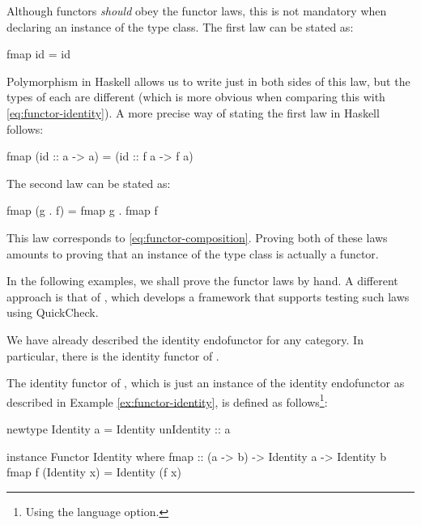 Although functors \emph{should} obey the functor laws, this is not
mandatory when declaring an instance of the  type
class. The first law can be stated as:
\begin{codehaskell}
fmap id = id
\end{codehaskell}
Polymorphism in Haskell allows us to write just  in
both sides of this law, but the types of each  are
different (which is more obvious when comparing this with
\eqref{eq:functor-identity}). A more precise way of stating the first
law in Haskell follows:
\begin{codehaskell}
fmap (id :: a -> a) = (id :: f a -> f a)
\end{codehaskell}
The second law can be stated as:
\begin{codehaskell}
fmap (g . f) = fmap g . fmap f
\end{codehaskell}
This law corresponds to \eqref{eq:functor-composition}. Proving both
of these laws amounts to proving that an instance of the
 type class is actually a functor.

\begin{remark}

  In the following examples, we shall prove the functor laws by hand.
  A different approach is that of \parencite{jeuring-2012}, which
  develops a framework that supports testing such laws using
  QuickCheck.

\end{remark}

We have already described the identity endofunctor for any category.
In particular, there is the identity functor of \hask.

\begin{example}
  \label{ex:functor-identity-haskell}

  The identity functor of \hask, which is just an instance of the
  identity endofunctor as described in Example
  \ref{ex:functor-identity}, is defined as follows\footnote{Using the
     language option.}:
  \begin{codehaskell}
newtype Identity a = Identity {unIdentity :: a}

instance Functor Identity where
  fmap :: (a -> b) -> Identity a -> Identity b
  fmap f (Identity x) = Identity (f x)
  \end{codehaskell}


\end{example}

